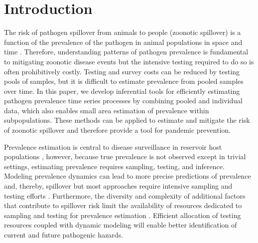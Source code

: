 \documentclass{article}
\begin{document}
%
\section{Introduction}

The risk of pathogen spillover from animals to people (zoonotic spillover) is a function of the prevalence of the pathogen in animal populations in space and time \cite{becker2021ecological}. Therefore, understanding patterns of pathogen prevalence is fundamental to mitigating zoonotic disease events but the intensive testing required to do so is often prohibitively costly. Testing and survey costs can be reduced by testing pools of samples, but it is difficult to estimate prevalence from pooled samples over time. In this paper, we develop inferential tools for efficiently estimating pathogen prevalence time series processes by combining pooled and individual data, which also enables small area estimation of prevalence within subpopulations. These methods can be applied to estimate and mitigate the risk of zoonotic spillover and therefore provide a tool for pandemic prevention.

Prevalence estimation is central to disease surveillance in reservoir host populations \cite{kuiken2005pathogen}, however, because true prevalence is not observed except in trivial settings, estimating prevalence requires sampling, testing, and inference. Modeling prevalence dynamics can lead to more precise predictions of prevalence and, thereby, spillover but most approaches require intensive sampling and testing efforts \cite{plowright2019sampling}. Furthermore, the diversity and complexity of additional factors that contribute to spillover risk limit the availability of resources dedicated to sampling and testing for prevalence estimation \cite{plowright2017pathways}. Efficient allocation of testing resources coupled with dynamic modeling will enable better identification of current and future pathogenic hazards. 
\end{document}
